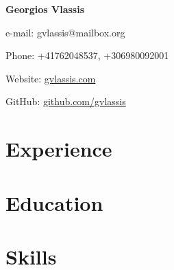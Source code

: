 \documentclass[a4paper]{article}
\begin{document}
\begin{Center}

	{\LARGE \bfseries \color{primary} Georgios Vlassis \par}

	\vspace{1em}

	{\large \color{secondary} e-mail: gvlassis@mailbox.org \par}

	\vspace{1em}

	{\large \color{secondary} Phone: +41762048537, +306980092001 \par}

	\vspace{1em}

	{\large \color{secondary} Website: \href{https://gvlassis.com/}{gvlassis.com} \par}

	\vspace{1em}

	{\large \color{secondary} GitHub: \href{https://github.com/gvlassis}{github.com/gvlassis} \par}

\end{Center}

\section*{Experience}

\section*{Education}

\section*{Skills}
\end{document}
